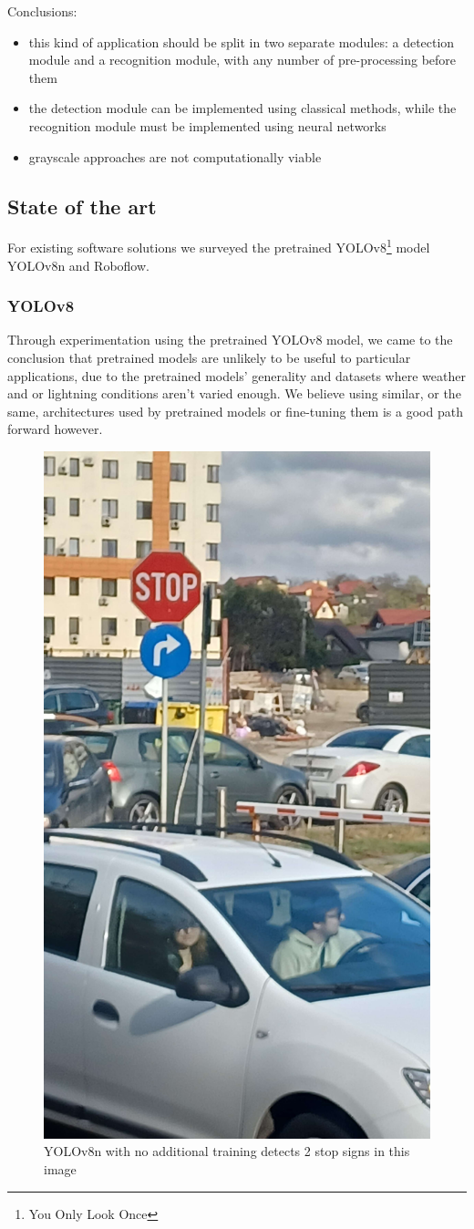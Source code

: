 \documentclass[conference]{IEEEtran}
\begin{document}
Conclusions:
\begin{itemize}
    \item this kind of application should be split in two separate modules: a detection module and a
    recognition module, with any number of pre-processing before them
    \item the detection module can be implemented using classical methods, while the recognition
    module must be implemented using neural networks
    \item grayscale approaches are not computationally viable
\end{itemize}

\subsection{State of the art}

For existing software solutions we surveyed the pretrained YOLOv8\cite{Jocher_YOLO_by_Ultralytics_2023}\footnote{You Only Look Once}
model YOLOv8n and Roboflow.

\subsubsection{YOLOv8}
Through experimentation using the pretrained YOLOv8 model, we came to the conclusion that pretrained
models are unlikely to be useful to particular applications, due to the pretrained models' generality
and datasets where weather and or lightning conditions aren't varied enough. We believe using similar,
or the same, architectures used by pretrained models or fine-tuning them is a good path forward however.

\begin{figure}[h!]
    \centerline{\includegraphics[width=0.5\linewidth,]{poza-fata-ac}}
    \caption{YOLOv8n with no additional training detects 2 stop signs in this image}
    \label{poza-fata-ac}
\end{figure}
\end{document}
